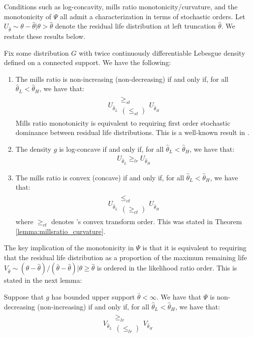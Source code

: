 \noindent Conditions such as log-concavity, mills ratio monotonicity/curvature, and the monotonicity of $\Psi$ all admit a characterization in terms of stochastic orders. Let $U_{\hat{\theta}}\sim \theta-\hat{\theta}|\theta>\hat{\theta}$ denote the residual life distribution at left truncation $\hat{\theta}$. We restate these results below. 

\begin{lemma}
Fix some distribution $G$ with twice continuously differentiable Lebesgue density defined on a connected support. We have the following:
\vspace{-5pt}
\begin{enumerate}[label=(\arabic*),ref=\thelemma(\arabic*)]
   \item The mills ratio is non-increasing (non-decreasing) if and only if, for all $\hat{\theta}_L <\hat{\theta}_H$, we have that:
   \begin{align*}
      U_{\hat{\theta}_L} \substack{\geq_{st} \\ (\leq_{st})}  U_{\hat{\theta}_H} 
   \end{align*}
   Mills ratio monotonicity is equivalent to requiring first order stochastic dominance between residual life distributions. This is a well-known result in \cite{shaked2007stochastic}. 
   \item The density $g$ is log-concave if and only if, for all $\hat{\theta}_L <\hat{\theta}_H$, we have that:
   \begin{align*}
      U_{\hat{\theta}_L} \geq_{lr}  U_{\hat{\theta}_H} 
   \end{align*}
   \item The mills ratio is convex (concave) if and only if, for all $\hat{\theta}_L <\hat{\theta}_H$, we have that:
   \begin{align*}
      U_{\hat{\theta}_L} \substack{\leq_{ct}\\ (\geq_{ct})} U_{\hat{\theta}_H}
   \end{align*}
   where $\geq_{ct}$ denotes \cite{vanzwet1964convex}'s convex transform order. This was stated in Theorem \ref{lemma:millsratio_curvature}. 
\end{enumerate}
\end{lemma}

\noindent The key implication of the monotonicity in $\Psi$ is that it is equivalent to requiring that the residual life distribution as a proportion of the maximum remaining life $V_{\hat{\theta}}\sim (\theta-\hat{\theta})/(\bar{\theta}-\hat{\theta})|\theta\geq \hat{\theta}$ is ordered in the likelihood ratio order. This is stated in the next lemma:
\begin{lemma}\label{lemma:phi_characterization}
Suppose that $g$ has bounded upper support $\bar{\theta}<\infty$. We have that $\Psi$ is non-decreasing (non-increasing) if and only if, for all $\hat{\theta}_L<\hat{\theta}_H$, we have that:
\begin{align*}
  V_{\hat{\theta}_L} \substack{\geq_{lr}\\(\leq_{lr})} V_{\hat{\theta}_H} 
\end{align*}
\end{lemma}

